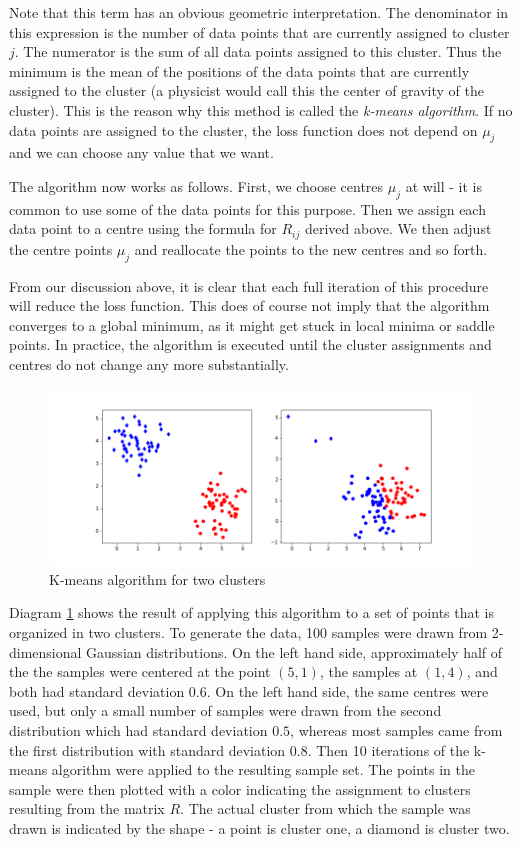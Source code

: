 \documentclass[a4paper, draft]{article}
\theoremstyle{own}
\theoremstyle{remark}
\begin{document}
Note that this term has an obvious geometric interpretation. The denominator in this expression is the number of data points that are currently assigned to cluster $j$. The numerator is the sum of all data points assigned to this cluster. Thus the minimum is the mean of the positions of the data points that are currently assigned to the cluster (a physicist would call this the center of gravity of the cluster). This is the reason why this method is called the {\em k-means algorithm}. If no data points are assigned to the cluster, the loss function does not depend on $\mu_j$ and we can choose any value that we want. 

The algorithm now works as follows. First, we choose centres $\mu_j$ at will - it is common to use some of the data points for this purpose. Then we assign each data point to a centre using the formula for $R_{ij}$ derived above. We then adjust the centre points $\mu_j$ and reallocate the points to the new centres and so forth. 

From our discussion above, it is clear that each full iteration of this procedure will reduce the loss function. This does of course not imply that the algorithm converges to a global minimum, as it might get stuck in local minima or saddle points. In practice, the algorithm is executed until the cluster assignments and centres do not change any more substantially. 

\begin{figure}[ht]
\centering
\includegraphics[width=1.0\linewidth]{KMeans}
\caption{K-means algorithm for two clusters}
\label{fig:KMeans}
\end{figure}

Diagram \ref{fig:KMeans} shows the result of applying this algorithm to a set of points that is organized in two clusters. To generate the data, 100 samples were drawn from 2-dimensional Gaussian distributions. On the left hand side, approximately half of the the samples were centered at the point $(5,1)$, the samples at $(1,4)$, and both had standard deviation $0.6$. On the left hand side, the same centres were used, but only a small number of samples were drawn from the second distribution which had standard deviation $0.5$, whereas most samples came from the first distribution with standard deviation $0.8$. Then 10 iterations of the k-means algorithm were applied to the resulting sample set. The points in the sample were then plotted with a color indicating the assignment to clusters resulting from the matrix $R$. The actual cluster from which the sample was drawn is indicated by the shape - a point is cluster one, a diamond is cluster two.
\end{document}
